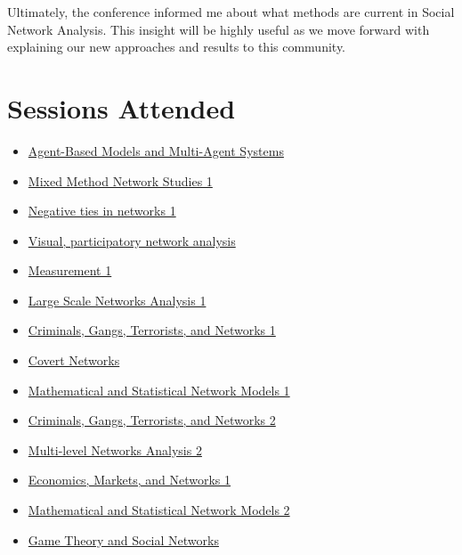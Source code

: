 \documentclass{article}
\begin{document}
Ultimately, the conference informed me about what methods are current in Social Network Analysis.  This insight will be highly useful as we move forward with explaining our new approaches and results to this community.

\section*{Sessions Attended}
\begin{multicols}{2}
\begin{itemize}
\item\href{http://www.insna.org/program2013/session.php?id=1|we-pm-1|Lecture\%20Hall\%20M}{Agent-Based Models and Multi-Agent Systems}
\item\href{http://www.insna.org/program2013/session.php?id=1|we-pm-2|Lecture%20Hall%20C}{Mixed Method Network Studies 1}
\item\href{http://www.insna.org/program2013/session.php?id=2|th-am-1|Lecture%20Hall%20A}{Negative ties in networks 1}
\item\href{http://www.insna.org/program2013/session.php?id=2|th-am-2|Room%20125}{Visual, participatory network analysis}
\item\href{http://www.insna.org/program2013/session.php?id=2|th-pm-1|Lecture%20Hall%20B}{Measurement 1}
\item\href{http://www.insna.org/program2013/session.php?id=2|th-pm-2|Lecture%20Hall%20M}{Large Scale Networks Analysis 1}
\item\href{http://www.insna.org/program2013/session.php?id=3|fr-am-1|Lecture%20Hall%20J}{Criminals, Gangs, Terrorists, and Networks 1}
\item\href{http://www.insna.org/program2013/session.php?id=3|fr-am-2|Lecture%20Hall%20J}{Covert Networks}
\item\href{http://www.insna.org/program2013/session.php?id=3|fr-pm-1|Lecture%20Hall%20A}{Mathematical and Statistical Network Models 1}
\item\href{http://www.insna.org/program2013/session.php?id=3|fr-pm-2|Lecture%20Hall%20H}{Criminals, Gangs, Terrorists, and Networks 2}
\item\href{http://www.insna.org/program2013/session.php?id=4|sa-am-1|Lecture%20Hall%20A}{Multi-level Networks Analysis 2}
\item\href{http://www.insna.org/program2013/session.php?id=4|sa-am-2|Room%20125}{Economics, Markets, and Networks 1}
\item\href{http://www.insna.org/program2013/session.php?id=4|sa-pm-1|Lecture%20Hall%20A}{Mathematical and Statistical Network Models 2}
\item\href{http://www.insna.org/program2013/session.php?id=4|sa-pm-2|Lecture%20Hall%20M}{Game Theory and Social Networks}
\end{itemize}
\end{multicols}
\end{document}
